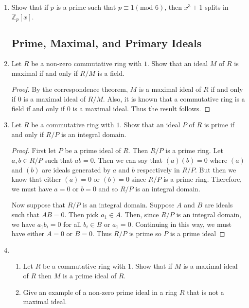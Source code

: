 \documentclass{article}
\theoremstyle{definition}
\newcommand{\m}[1]{(\text{mod }{#1})}
\newcommand{\Z}{\mathbb{Z}}
\begin{document}
\begin{enumerate}
            \item Show that if $p$ is a prime such that $p\equiv 1\m{6}$, then $x^3+1$ splits in $\Z_p[x]$.
        
        \subsection{Prime, Maximal, and Primary Ideals}

            \item Let $R$ be a non-zero commutative ring with $1$. Show that an ideal $M$ of $R$ is maximal if and only if $R/M$ is a field.
            
            \begin{proof}
                By the correspondence theorem, $M$ is a maximal ideal of $R$ if and only if $0$ is a maximal ideal of $R/M$. Also, it is known that a commutative ring is a field if and only if $0$ is a maximal ideal. Thus the result follows.
            \end{proof}

            \item Let $R$ be a commutative ring with $1$. Show that an ideal $P$ of $R$ is prime if and only if $R/P$ is an integral domain.
            
            \begin{proof}
                First let $P$ be a prime ideal of $R$. Then $R/P$ is a prime ring. Let $a,b \in R/P$ such that $ab=0$. Then we can say that $(a)(b)=0$ where $(a)$ and $(b)$ are ideals generated by $a$ and $b$ respectively in $R/P$. But then we know that either $(a)=0$ or $(b)=0$ since $R/P$ is a prime ring. Therefore, we must have $a=0$ or $b=0$ and so $R/P$ is an integral domain.

                Now suppose that $R/P$ is an integral domain. Suppose $A$ and $B$ are ideals such that $AB=0$. Then pick $a_1\in A$. Then, since $R/P$ is an integral domain, we have $a_1b_i=0$ for all $b_i\in B$ or $a_1=0$. Continuing in this way, we must have either $A=0$ or $B=0$. Thus $R/P$ is prime so $P$ is a prime ideal
            \end{proof}

            \item
                \begin{enumerate}
                    \item Let $R$ be a commutative ring with $1$. Show that if $M$ is a maximal ideal of $R$ then $M$ is a prime ideal of $R$.
                    \item Give an example of a non-zero prime ideal in a ring $R$ that is not a maximal ideal.
                \end{enumerate}


\end{enumerate}
\end{document}

